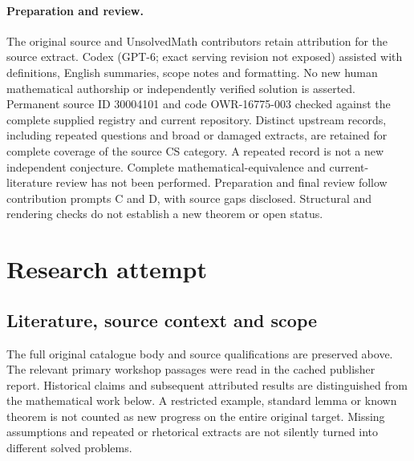 \documentclass[11pt]{article}
\begin{document}
\paragraph{Preparation and review.}
The original source and UnsolvedMath contributors retain attribution for the source extract. Codex (GPT-6; exact serving revision not exposed) assisted with definitions, English summaries, scope notes and formatting. No new human mathematical authorship or independently verified solution is asserted. Permanent source ID 30004101 and code OWR-16775-003 checked against the complete supplied registry and current repository. Distinct upstream records, including repeated questions and broad or damaged extracts, are retained for complete coverage of the source CS category. A repeated record is not a new independent conjecture. Complete mathematical-equivalence and current-literature review has not been performed. Preparation and final review follow contribution prompts C and D, with source gaps disclosed. Structural and rendering checks do not establish a new theorem or open status.
\label{end:30004101}

\section{Research attempt}
\subsection{Literature, source context and scope}
The full original catalogue body and source qualifications are preserved above. The relevant primary workshop passages were read in the cached publisher report. Historical claims and subsequent attributed results are distinguished from the mathematical work below. A restricted example, standard lemma or known theorem is not counted as new progress on the entire original target. Missing assumptions and repeated or rhetorical extracts are not silently turned into different solved problems.
\end{document}
